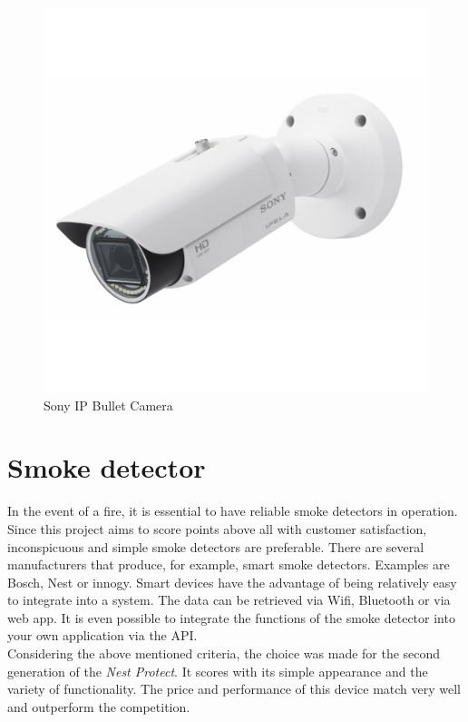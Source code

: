 \newpage
\begin{figure}[h]
	\centering
	\includegraphics[width=.5\textwidth]{images/CostAnalysis/sony-ip-bullet-kamera} 
	\caption[Sony IP Bullet Camera]{Sony IP Bullet Camera\footnotemark}
	\label{fig:sonyCamera}
\end{figure}

\section{Smoke detector}
In the event of a fire, it is essential to have reliable smoke detectors in operation. Since this project aims to score points above all with customer satisfaction, inconspicuous and simple smoke detectors are preferable. There are several manufacturers that produce, for example, smart smoke detectors. Examples are Bosch, Nest or innogy. Smart devices have the advantage of being relatively easy to integrate into a system. The data can be retrieved via Wifi, Bluetooth or via web app. It is even possible to integrate the functions of the smoke detector into your own application via the API.
\\
Considering the above mentioned criteria, the choice was made for the second generation of the \textit{Nest Protect}. It scores with its simple appearance and the variety of functionality.  The price and performance of this device match very well and outperform the competition.

